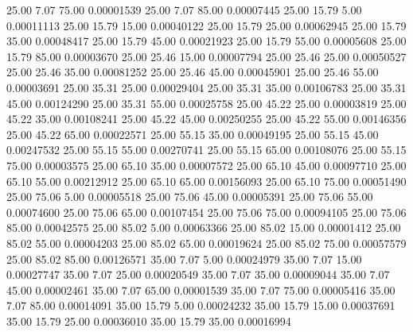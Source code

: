      25.00      7.07     75.00     0.00001539
     25.00      7.07     85.00     0.00007445
     25.00     15.79      5.00     0.00011113
     25.00     15.79     15.00     0.00040122
     25.00     15.79     25.00     0.00062945
     25.00     15.79     35.00     0.00048417
     25.00     15.79     45.00     0.00021923
     25.00     15.79     55.00     0.00005608
     25.00     15.79     85.00     0.00003670
     25.00     25.46     15.00     0.00007794
     25.00     25.46     25.00     0.00050527
     25.00     25.46     35.00     0.00081252
     25.00     25.46     45.00     0.00045901
     25.00     25.46     55.00     0.00003691
     25.00     35.31     25.00     0.00029404
     25.00     35.31     35.00     0.00106783
     25.00     35.31     45.00     0.00124290
     25.00     35.31     55.00     0.00025758
     25.00     45.22     25.00     0.00003819
     25.00     45.22     35.00     0.00108241
     25.00     45.22     45.00     0.00250255
     25.00     45.22     55.00     0.00146356
     25.00     45.22     65.00     0.00022571
     25.00     55.15     35.00     0.00049195
     25.00     55.15     45.00     0.00247532
     25.00     55.15     55.00     0.00270741
     25.00     55.15     65.00     0.00108076
     25.00     55.15     75.00     0.00003575
     25.00     65.10     35.00     0.00007572
     25.00     65.10     45.00     0.00097710
     25.00     65.10     55.00     0.00212912
     25.00     65.10     65.00     0.00156093
     25.00     65.10     75.00     0.00051490
     25.00     75.06      5.00     0.00005518
     25.00     75.06     45.00     0.00005391
     25.00     75.06     55.00     0.00074600
     25.00     75.06     65.00     0.00107454
     25.00     75.06     75.00     0.00094105
     25.00     75.06     85.00     0.00042575
     25.00     85.02      5.00     0.00063366
     25.00     85.02     15.00     0.00001412
     25.00     85.02     55.00     0.00004203
     25.00     85.02     65.00     0.00019624
     25.00     85.02     75.00     0.00057579
     25.00     85.02     85.00     0.00126571
     35.00      7.07      5.00     0.00024979
     35.00      7.07     15.00     0.00027747
     35.00      7.07     25.00     0.00020549
     35.00      7.07     35.00     0.00009044
     35.00      7.07     45.00     0.00002461
     35.00      7.07     65.00     0.00001539
     35.00      7.07     75.00     0.00005416
     35.00      7.07     85.00     0.00014091
     35.00     15.79      5.00     0.00024232
     35.00     15.79     15.00     0.00037691
     35.00     15.79     25.00     0.00036010
     35.00     15.79     35.00     0.00016994
